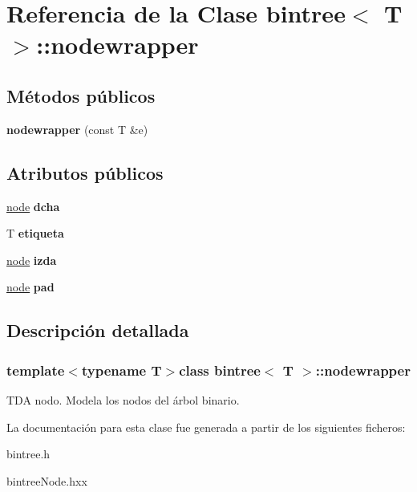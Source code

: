 \hypertarget{classbintree_1_1nodewrapper}{}\section{Referencia de la Clase bintree$<$ T $>$\+:\+:nodewrapper}
\label{classbintree_1_1nodewrapper}
\subsection*{Métodos públicos}
\begin{DoxyCompactItemize}
\item 
\hypertarget{classbintree_1_1nodewrapper_a791513cef8c5dd5e9e8bdaad163e7908}{}{\bfseries nodewrapper} (const T \&e)\label{classbintree_1_1nodewrapper_a791513cef8c5dd5e9e8bdaad163e7908}

\end{DoxyCompactItemize}
\subsection*{Atributos públicos}
\begin{DoxyCompactItemize}
\item 
\hypertarget{classbintree_1_1nodewrapper_a1c7c21d283bb1137a9fad706981f2db5}{}\hyperlink{classbintree_1_1node}{node} {\bfseries dcha}\label{classbintree_1_1nodewrapper_a1c7c21d283bb1137a9fad706981f2db5}

\item 
\hypertarget{classbintree_1_1nodewrapper_a30292225eee21c2d18775bfe28931a82}{}T {\bfseries etiqueta}\label{classbintree_1_1nodewrapper_a30292225eee21c2d18775bfe28931a82}

\item 
\hypertarget{classbintree_1_1nodewrapper_a58413d8c245727446693dd9dc07cc851}{}\hyperlink{classbintree_1_1node}{node} {\bfseries izda}\label{classbintree_1_1nodewrapper_a58413d8c245727446693dd9dc07cc851}

\item 
\hypertarget{classbintree_1_1nodewrapper_a143e79d080bb11a2792c3dc58d58ec8d}{}\hyperlink{classbintree_1_1node}{node} {\bfseries pad}\label{classbintree_1_1nodewrapper_a143e79d080bb11a2792c3dc58d58ec8d}

\end{DoxyCompactItemize}


\subsection{Descripción detallada}
\subsubsection*{template$<$typename T$>$class bintree$<$ T $>$\+::nodewrapper}

T\+D\+A nodo. Modela los nodos del árbol binario. 

La documentación para esta clase fue generada a partir de los siguientes ficheros\+:\begin{DoxyCompactItemize}
\item 
bintree.\+h\item 
bintree\+Node.\+hxx\end{DoxyCompactItemize}
